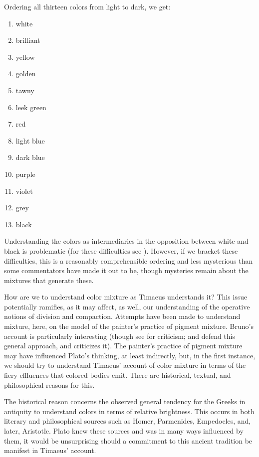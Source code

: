 Ordering all thirteen colors from light to dark, we get:
\begin{enumerate}
	\item white
	\item brilliant
	\item yellow
	\item golden
	\item tawny
	\item leek green
	\item red
	\item light blue
	\item dark blue
	\item purple
	\item violet
	\item grey
	\item black
\end{enumerate}
Understanding the colors as intermediaries in the opposition between white and black is problematic (for these difficulties see \citealt[chapter 6.3]{Kalderon:2015fr}). However, if we bracket these difficulties, this is a reasonably comprehensible ordering and less mysterious than some commentators have made it out to be, though mysteries remain about the mixtures that generate these.

How are we to understand color mixture as Timaeus understands it? This issue potentially ramifies, as it may affect, as well, our understanding of the operative notions of division and compaction. Attempts have been made to understand mixture, here, on the model of the painter's practice of pigment mixture. Bruno's \citeyearpar[chapter 10]{Bruno:1977fk} account is particularly interesting (though see \citealt[]{Gage:1993aa} for criticism; \citealt[278]{Cornford:1935fk} and \citealt{Levides:2002aa} defend this general approach, and \citealt{Struycken:2003zr} criticizes it). The painter's practice of pigment mixture may have influenced Plato's thinking, at least indirectly, but, in the first instance, we should try to understand Timaeus' account of color mixture in terms of the fiery effluences that colored bodies emit. There are historical, textual, and philosophical reasons for this. 

The historical reason concerns the observed general tendency for the Greeks in antiquity to understand colors in terms of relative brightness. This occurs in both literary and philosophical sources such as Homer, Parmenides, Empedocles, and, later, Aristotle. Plato knew these sources and was in many ways influenced by them, it would be unsurprising should a commitment to this ancient tradition be manifest in Timaeus' account.


